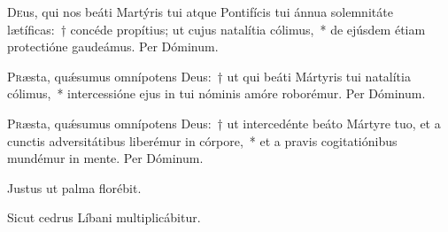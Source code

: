 \documentclass[vesperale_romanum.tex]{subfiles}
\begin{document}
\lettrine{D}{e}us, qui nos beáti  \nomen{} Martýris tui atque Pontifícis tui ánnua solemnitáte lætíficas:~† concéde propítius; ut cujus natalítia cólimus,~* de ejúsdem étiam protectióne gaudeámus. Per Dóminum.


\lettrine{P}{r}æsta, quǽsumus omnípotens Deus:~† ut qui beáti \nomen{} Mártyris tui natalítia cólimus,~* intercessióne ejus in tui nóminis amóre roborémur. Per Dóminum.

\aliaoratio

\lettrine{P}{r}æsta, quǽsumus omnípotens Deus:~† ut intercedénte beáto \nomen{} Mártyre tuo, et a cunctis adversitátibus liberémur in córpore,~*  et a pravis cogitatiónibus mundémur in mente. Per Dóminum.





\newpage


\vv Justus ut palma florébit.

\rr Sicut cedrus Líbani multiplicábitur.

\label{an_qui_vult_venire_solesmes_1961}
{}
\end{document}
